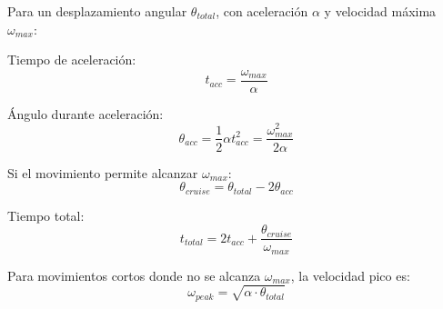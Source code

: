 Para un desplazamiento angular $\theta_{total}$, con aceleración $\alpha$ y velocidad máxima $\omega_{max}$:

Tiempo de aceleración:
\begin{equation}
t_{acc} = \frac{\omega_{max}}{\alpha}
\end{equation}

Ángulo durante aceleración:
\begin{equation}
\theta_{acc} = \frac{1}{2}\alpha t_{acc}^2 = \frac{\omega_{max}^2}{2\alpha}
\end{equation}

Si el movimiento permite alcanzar $\omega_{max}$:
\begin{equation}
\theta_{cruise} = \theta_{total} - 2\theta_{acc}
\end{equation}

Tiempo total:
\begin{equation}
t_{total} = 2t_{acc} + \frac{\theta_{cruise}}{\omega_{max}}
\end{equation}

Para movimientos cortos donde no se alcanza $\omega_{max}$, la velocidad pico es:
\begin{equation}
\omega_{peak} = \sqrt{\alpha \cdot \theta_{total}}
\end{equation}

